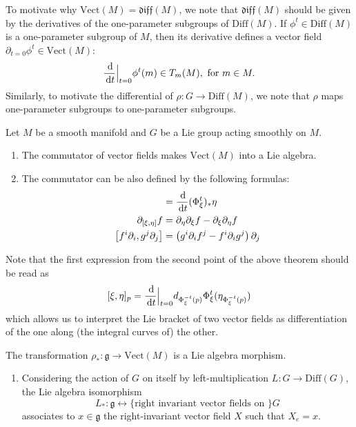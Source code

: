 \documentclass{report}
\begin{document}
\begin{remark}
    To motivate why $\mathrm{Vect}(M) = \mathfrak{diff}(M)$, we note that $\mathfrak{diff}(M)$ should be given by the derivatives of the one-parameter subgroups of $\mathrm{Diff}(M)$.
    If $\phi^t \in \mathrm{Diff}(M)$ is a one-parameter subgroup of $M$, then its derivative defines a vector field $\partial_{t=0} \phi^t \in \mathrm{Vect}(M)$:
    \[
    \frac{\,\mathrm{d}}{\,\mathrm{d} t}\Big|_{t=0} \phi^t(m) \in T_m(M), \text{ for } m \in M.
    \]
    Similarly, to motivate the differential of $\rho: G \to \mathrm{Diff}(M)$, we note that $\rho$ maps one-parameter subgroups to one-parameter subgroups.
\end{remark}

\begin{proposition}
    Let $M$ be a smooth manifold and $G$ be a Lie group acting smoothly on $M$.
    \begin{enumerate}[label = (\roman*)]
        \item The commutator of vector fields makes $\mathrm{Vect}(M)$ into a Lie algebra.
        \item The commutator can be also defined by the following formulas:
        \begin{align*}
            [\xi, \eta] &= \frac{\d}{\d t} (\Phi^t_\xi)_* \eta \\
            \partial_{[\xi, \eta]}f &= \partial_\eta \partial_\xi f - \partial_\xi \partial_\eta f\\
            \left[ f^i \partial_i, g^j \partial_j \right] &= \left( g^i \partial_i f^j - f^i \partial_i g^j \right) \partial_j
        \end{align*}
    \end{enumerate}
\end{proposition}
Note that the first expression from the second point of the above theorem should be read as
\[
[\xi, \eta]_p = \frac{\,\mathrm{d}}{\,\mathrm{d} t}\Big|_{t=0} d_{\Phi^{-t}_\xi(p)} \Phi^t_\xi (\eta_{\Phi^{-t}_\xi(p)})
\]
which allows us to interpret the Lie bracket of two vector fields as differentiation of the one along (the integral curves of) the other.

\begin{theorem}
    The transformation $\rho_*: \mathfrak g \to \mathrm{Vect}(M)$ is a Lie algebra morphism.
\end{theorem}

\begin{example}
    \begin{enumerate}[label = (\roman*)]
        \item Considering the action of $G$ on itself by left-multiplication $L: G \to \mathrm{Diff}(G)$, the Lie algebra isomorphism
        \[
        L_*: \mathfrak g \leftrightarrow \{\text{right invariant vector fields on } \} G
        \]
        associates to $x \in \mathfrak g$ the right-invariant vector field $X$ such that $X_e = x$.
    \end{enumerate}
\end{example}
\end{document}
